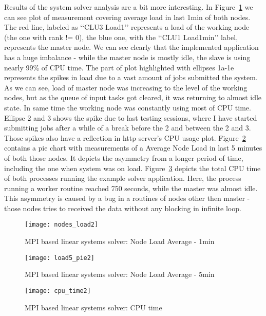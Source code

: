 Results of the system solver analysis are a bit more interesting. In Figure~\ref{fig:nodes_load2} we can see plot of measurement covering average load in last 1min of both nodes. The red line, labeled as \lq\lq{}CLU3 Load1\rq\rq{} represents a load of the working node (the one with rank != 0), the blue one, with the \lq\lq{}CLU1 Load1min\rq\rq{} label, represents the master node. We can see clearly that the implemented application has a huge imbalance - while the master node is mostly idle, the slave is using nearly 99\% of CPU time. The part of plot highlighted with ellipses 1a-1e represents the spikes in load due to a vast amount of jobs submitted the system. As we can see, load of master node was increasing to the level of the working nodes, but as the queue of input tasks got cleared, it was returning to almost idle state. In same time the working node was constantly using most of CPU time. Ellipse 2 and 3 shows the spike due to last testing sessions, where I have started submitting jobs after a while of a break before the 2 and between the 2 and 3. Those spikes also have a reflection in http server\rq{}s CPU usage plot. Figure~\ref{fig:load5_pie2} contains a pie chart with measurements of a Average Node Load in last 5 minutes of both those nodes. It depicts the asymmetry from a longer period of time, including the one when system was on load. Figure~\ref{fig:total_cpu_time} depicts the total CPU time of both processes running the example solver application. Here, the process running a worker routine reached 750 seconds, while the master was almost idle. This asymmetry is caused by a bug in a routines of nodes other then master - those nodes tries to received the data without any blocking in infinite loop.

\begin{figure}[ht]
\centering
\texttt{[image: nodes\_load2]}
\caption{MPI based linear systems solver: Node Load Average - 1min}
\label{fig:nodes_load2}
\end{figure}

\begin{figure}[ht]
\centering
\texttt{[image: load5\_pie2]}
\caption{MPI based linear systems solver: Node Load Average - 5min}
\label{fig:load5_pie2}
\end{figure}

\begin{figure}[ht]
\centering
\texttt{[image: cpu\_time2]}
\caption{MPI based linear systems solver: CPU time}
\label{fig:total_cpu_time}
\end{figure}
